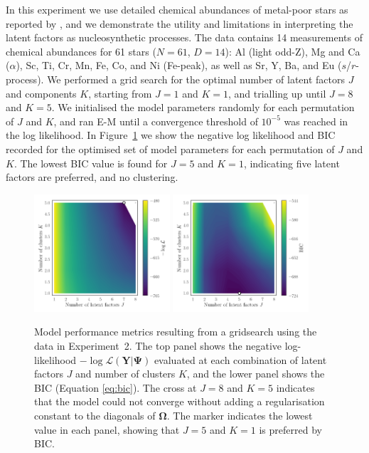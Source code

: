 \documentclass[twocolumn]{aastex61}
\newcommand{\vect}[1]{\boldsymbol{\mathbf{#1}}}
\renewcommand{\vec}[1]{\vect{#1}}
\newcommand{\data}{\textbf{Y}}
\newcommand{\scorecovs}{\vec\Omega}
\begin{document}
In this experiment we use detailed chemical abundances of metal-poor stars as
reported by \citet{Barklem:2003}, and we demonstrate the utility and limitations
in interpreting the latent factors as nucleosynthetic processes. The data 
contains 14 measurements of chemical abundances for 61 stars ($N = 61$, $D = 14$): 
Al (light odd-Z), Mg and Ca ($\alpha$), Sc, Ti, Cr, Mn, Fe, Co, and Ni (Fe-peak),
as well as Sr, Y, Ba, and Eu ($s$/$r$-process). We performed a grid search for
the optimal number of latent factors $J$ and components $K$, starting from
$J = 1$ and $K = 1$, and trialling up until $J = 8$ and $K = 5$. We initialised
the model parameters randomly for each permutation of $J$ and $K$, and ran E-M
until a convergence threshold of $10^{-5}$ was reached in the log likelihood. 
In Figure~\ref{fig:exp2-gridsearch-contours} we show the negative log likelihood 
and BIC recorded for the optimised set of model parameters for each permutation 
of $J$ and $K$. The lowest BIC value is found for $J = 5$ and $K = 1$, indicating
five latent factors are preferred, and no clustering.

\begin{figure}
	\includegraphics[width=0.45\textwidth]{experiments/exp2-gridsearch-ll.png}
	\includegraphics[width=0.45\textwidth]{experiments/exp2-gridsearch-bic.png}
    \caption{Model performance metrics resulting from a gridsearch using the
    		 \citet{Barklem:2003} data in Experiment~2.
    		 The top panel shows the negative log-likelihood 
			 $-\log{\mathcal{L}\left(\data|\vec\Psi\right)}$ 
			 evaluated at each combination of latent factors $J$ and number 
			 of clusters $K$, and the lower panel shows the BIC (Equation \ref{eq:bic}).
			 The cross at
			 $J=8$ and $K=5$ indicates that the model could not converge without
			 adding a regularisation constant to the diagonals of $\scorecovs$.
			 The marker indicates the lowest value in each panel, showing that
			 $J = 5$ and $K = 1$ is preferred by BIC.}
    \label{fig:exp2-gridsearch-contours}
\end{figure}
\end{document}

